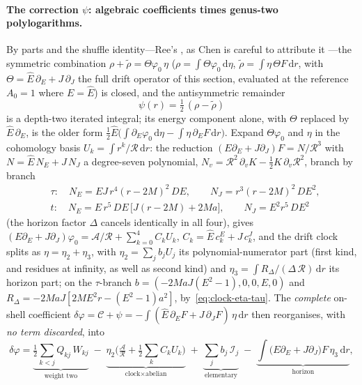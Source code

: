 \documentclass[12pt]{iopart}
\theoremstyle{plain}
\theoremstyle{definition}
\theoremstyle{remark}
\newcommand{\Ehat}{\hat E}
\newcommand{\dd}{\mathrm{d}}
\begin{document}
\paragraph{The correction $\psi$: algebraic coefficients times genus-two
polylogarithms.} By parts and the shuffle identity---Ree's \cite{Ree1958}, as Chen is careful to
attribute it \cite[\S1.1]{Chen1977}---the symmetric
combination $\rho+\tilde\rho=\Theta\varphi_0\,\eta$
($\rho=\int\Theta\varphi_0\,\dd\eta$,
$\tilde\rho=\int\eta\,\Theta F\,\dd r$, with $\Theta=\Ehat\,\partial_E+J\,\partial_J$ the
full drift operator of this section, evaluated at the reference $A_0=1$ where
$E=\Ehat$) is closed, and the antisymmetric remainder
\begin{equation}
    \psi(r)=\tfrac12\,(\rho-\tilde\rho)
    \label{eq:psi-irr}
\end{equation}
is a depth-two iterated integral; its energy component alone, with $\Theta$ replaced by
$\Ehat\,\partial_E$, is the older form $\tfrac12\Ehat\big(\int\partial_E\varphi_0\,\dd\eta
-\int\eta\,\partial_EF\,\dd r\big)$. Expand $\Theta\varphi_0$ and $\eta$ in the
cohomology basis $U_k=\int r^k/\mathcal{R}\,\dd r$: the reduction
$(E\partial_E+J\partial_J)F=N/\mathcal{R}^3$ with $N=\Ehat\,N_E+J\,N_J$ a degree-seven
polynomial, $N_v=\mathcal R^2\,\partial_vK-\tfrac12K\,\partial_v\mathcal R^2$, branch by
branch
\[
\begin{aligned}
    &\tau:\quad N_E=EJ\,r^4(r-2M)^2\,DE,\qquad N_J=r^3(r-2M)^2\,DE^2,\\
    &t:\quad N_E=E\,r^5\,DE\,\big[J(r-2M)+2Ma\big],\qquad N_J=E^2r^5\,DE^2
\end{aligned}
\]
(the horizon factor $\Delta$ cancels identically in all four), gives
$(E\partial_E+J\partial_J)\varphi_0=\mathcal{A}/\mathcal{R}+\sum_{k=0}^{4} C_k U_k$,
$C_k=\Ehat\,c_k^{E}+J\,c_k^{J}$, and the drift clock splits as
$\eta=\eta_2+\eta_3$, with $\eta_2=\sum_j b_jU_j$ its polynomial-numerator part (first
kind, and residues at infinity, as well as second kind) and
$\eta_3=\int R_\Delta/(\Delta\,\mathcal R)\,\dd r$ its horizon part; on the
$\tau$-branch $b=(-2MaJ(E^2-1),0,0,E,0)$ and
$R_\Delta=-2MaJ[2ME^2r-(E^2-1)a^2]$, by~\eqref{eq:clock-eta-tau}. The
\emph{complete} on-shell coefficient $\delta\varphi=\mathcal{C}+\psi
=-\!\int(\Ehat\,\partial_E F+J\,\partial_J F)\,\eta\,\dd r$ then reorganises, with
\emph{no term discarded}, into
\begin{equation}
    \delta\varphi=
    \underbrace{\tfrac12\!\sum_{k<j}Q_{kj}\,W_{kj}}_{\text{weight two}}
    \;-\;\underbrace{\eta_2\Big(\tfrac{\mathcal{A}}{\mathcal{R}}
    +\tfrac12\!\sum_k C_k U_k\Big)}_{\text{clock}\times\text{abelian}}
    \;+\;\underbrace{\sum_j b_j\,\mathcal{I}_j}_{\text{elementary}}
    \;-\;\underbrace{\int\!\big(E\partial_E+J\partial_J\big)F\,\eta_3\,\dd r}_{\text{horizon}},
    \label{eq:psi-split}
\end{equation}
\end{document}
